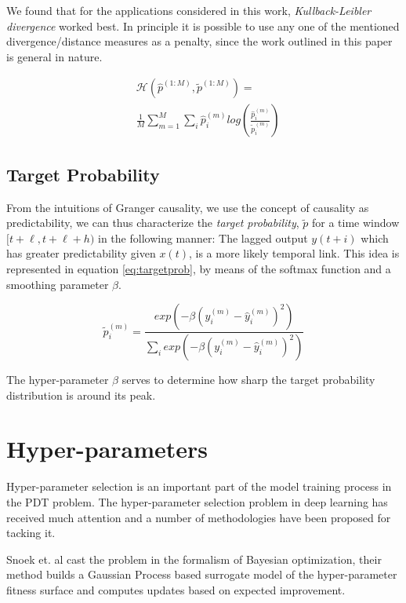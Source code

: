 \documentclass[envcountsect,runningheads]{llncs}
\theoremstyle{etoile}
\begin{document}
We found that for the applications considered in this work, \emph{Kullback-Leibler divergence} 
worked best. In principle it is possible to use any one of the mentioned 
divergence/distance measures as a penalty, since the work outlined in this 
paper is general in nature.

\begin{align}\label{eq:causaldiv}
&\mathcal{H}\left(\hat{p}^{(1:M)}, \tilde{p}^{(1:M)} \right) = \\
&\nonumber \frac{1}{M} \sum_{m = 1}^{M}{\sum_{i}{\hat{p}^{(m)}_{i}log \left (\frac{\hat{p}^{(m)}_i}{\tilde{p}^{(m)}_i} \right)}}
\end{align}


\subsection{Target Probability}\label{sec:targetprob}

From the intuitions of Granger causality, we use the concept of causality as predictability, 
we can thus characterize the \emph{target probability}, $\widetilde{p}$ for a time window 
$[t+\ell, t+\ell+h)$ in the following manner: The lagged output $y(t+i)$ which has greater 
predictability given $x(t)$, is a more likely temporal link. This idea is represented in 
equation \ref{eq:targetprob}, by means of the softmax function and a smoothing parameter 
$\beta$.

\begin{equation}\label{eq:targetprob}
\widetilde{p}_{i}^{(m)} = \frac{exp \left(- \beta (y_{i}^{(m)} - \hat{y}_{i}^{(m)})^{2} \right)}
{\sum_{i}{exp \left(- \beta (y_{i}^{(m)} - \hat{y}_{i}^{(m)})^{2} \right)}} 
\end{equation}

The hyper-parameter $\beta$ serves to determine how sharp the target probability distribution is 
around its peak.


\section{Hyper-parameters}

Hyper-parameter selection is an important part of the model training process in the PDT problem. 
The hyper-parameter selection problem in deep learning has received much attention and a number 
of methodologies have been proposed for tacking it. 

Snoek et. al \cite{snoek2012practical} cast the problem in the formalism of Bayesian optimization, their method 
builds a Gaussian Process based surrogate model of the hyper-parameter fitness surface and computes 
updates based on expected improvement. 
\end{document}
